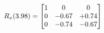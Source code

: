 \documentclass[preview]{standalone}
\begin{document}
\begin{align*}
\special{dvisvgm:raw <g id='unique000'>}R_{x}(3.98) = \begin{bmatrix}1 & 0 & 0 \\0 & -0.67 & +0.74 \\0 & -0.74 & -0.67\end{bmatrix}\special{dvisvgm:raw </g>}
\end{align*}
\end{document}
